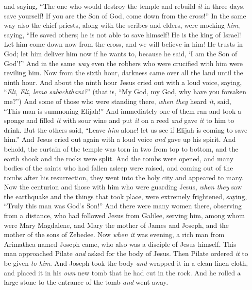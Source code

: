 \begin{biblechapter}
\verse and saying, “The one who would destroy the temple and rebuild \textit{it} in three days, save yourself! If you are the Son of God, come down from the cross!”
\verse In the same way also the chief priests, along with the scribes and elders, were mocking \textit{him}, saying,
\verse “He saved others; he is not able to save himself! He is the king of Israel! Let him come down now from the cross, and we will believe in him!
\verse He trusts in God; let him deliver him now if he wants to, because he said, ‘I am the Son of God’!”
\verse And in the same \textit{way} even the robbers who were crucified with him were reviling him.
 Now from the sixth hour, darkness came over all the land until the ninth hour.
\verse And about the ninth hour Jesus cried out with a loud voice, saying, “\textit{Eli, Eli, lema sabachthani?}” (that is, “My God, my God, why have you forsaken me?”)
\verse And some of those who were standing there, \textit{when they} heard \textit{it}, said, “This man is summoning Elijah!”
\verse And immediately one of them ran and took a sponge and filled \textit{it} with sour wine and put \textit{it} on a reed \textit{and} gave \textit{it} to him to drink.
\verse But the others said, “Leave \textit{him} alone! let us see if Elijah is coming to save him.”
\verse And Jesus cried out again with a loud voice \textit{and} gave up his spirit.
\verse And behold, the curtain of the temple was torn in two from top to bottom, and the earth shook and the rocks were split.
\verse And the tombs were opened, and many bodies of the saints who had fallen asleep were raised,
\verse and coming out of the tombs after his resurrection, they went into the holy city and appeared to many.
\verse Now the centurion and those with him who were guarding Jesus, \textit{when they} saw the earthquake and the things that took place, were extremely frightened, saying, “Truly this man was God’s Son!”
\verse And there were many women there, observing from a distance, who had followed Jesus from Galilee, serving him,
\verse among whom were Mary Magdalene, and Mary the mother of James and Joseph, and the mother of the sons of Zebedee.
 Now \textit{when it} was evening, a rich man from Arimathea named Joseph came, who also was a disciple of Jesus himself.
\verse This man approached Pilate \textit{and} asked for the body of Jesus. Then Pilate ordered \textit{it} to be given \textit{to him}.
\verse And Joseph took the body \textit{and} wrapped it in a clean linen cloth,
\verse and placed it in his \textit{own} new tomb that he had cut in the rock. And he rolled a large stone to the entrance of the tomb \textit{and} went away.

\end{biblechapter}

